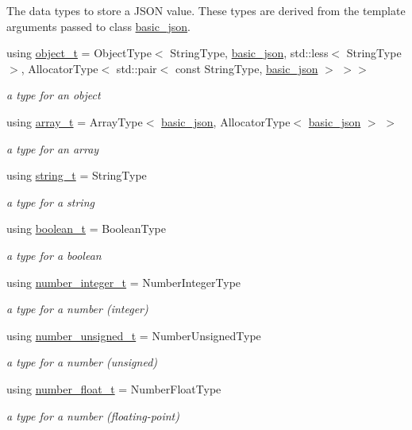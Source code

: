 The data types to store a J\+S\+ON value. These types are derived from the template arguments passed to class \mbox{\hyperlink{classnlohmann_1_1basic__json}{basic\+\_\+json}}. \begin{DoxyCompactItemize}
\item 
using \mbox{\hyperlink{classnlohmann_1_1basic__json_aa1eb13d5aa86f80cbee6c58e90fbaf49}{object\+\_\+t}} = Object\+Type$<$ String\+Type, \mbox{\hyperlink{classnlohmann_1_1basic__json}{basic\+\_\+json}}, std\+::less$<$ String\+Type $>$, Allocator\+Type$<$ std\+::pair$<$ const String\+Type, \mbox{\hyperlink{classnlohmann_1_1basic__json}{basic\+\_\+json}} $>$ $>$$>$
\begin{DoxyCompactList}\small\item\em a type for an object \end{DoxyCompactList}\item 
using \mbox{\hyperlink{classnlohmann_1_1basic__json_ae095578e03df97c5b3991787f1056374}{array\+\_\+t}} = Array\+Type$<$ \mbox{\hyperlink{classnlohmann_1_1basic__json}{basic\+\_\+json}}, Allocator\+Type$<$ \mbox{\hyperlink{classnlohmann_1_1basic__json}{basic\+\_\+json}} $>$ $>$
\begin{DoxyCompactList}\small\item\em a type for an array \end{DoxyCompactList}\item 
using \mbox{\hyperlink{classnlohmann_1_1basic__json_a61f8566a1a85a424c7266fb531dca005}{string\+\_\+t}} = String\+Type
\begin{DoxyCompactList}\small\item\em a type for a string \end{DoxyCompactList}\item 
using \mbox{\hyperlink{classnlohmann_1_1basic__json_a4c919102a9b4fe0d588af64801436082}{boolean\+\_\+t}} = Boolean\+Type
\begin{DoxyCompactList}\small\item\em a type for a boolean \end{DoxyCompactList}\item 
using \mbox{\hyperlink{classnlohmann_1_1basic__json_a98e611d67b7bd75307de99c9358ab2dc}{number\+\_\+integer\+\_\+t}} = Number\+Integer\+Type
\begin{DoxyCompactList}\small\item\em a type for a number (integer) \end{DoxyCompactList}\item 
using \mbox{\hyperlink{classnlohmann_1_1basic__json_ab906e29b5d83ac162e823ada2156b989}{number\+\_\+unsigned\+\_\+t}} = Number\+Unsigned\+Type
\begin{DoxyCompactList}\small\item\em a type for a number (unsigned) \end{DoxyCompactList}\item 
using \mbox{\hyperlink{classnlohmann_1_1basic__json_a88d6103cb3620410b35200ee8e313d97}{number\+\_\+float\+\_\+t}} = Number\+Float\+Type
\begin{DoxyCompactList}\small\item\em a type for a number (floating-\/point) \end{DoxyCompactList}\end{DoxyCompactItemize}
